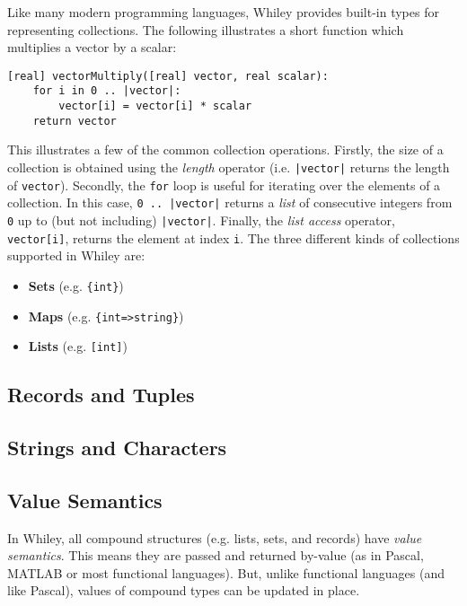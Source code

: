 Like many modern programming languages, Whiley provides built-in types
for representing collections.  The following illustrates a short
function which multiplies a vector by a scalar:
\begin{lstlisting}
[real] vectorMultiply([real] vector, real scalar):
    for i in 0 .. |vector|:
        vector[i] = vector[i] * scalar
    return vector
\end{lstlisting}
This illustrates a few of the common collection operations.  Firstly,
the size of a collection is obtained using the {\em length} operator
(i.e. \lstinline{|vector|} returns the length of \lstinline{vector}).
Secondly, the \lstinline{for} loop is useful for iterating over the
elements of a collection.  In this case, \lstinline{0 .. |vector|}
returns a {\em list} of consecutive integers from \lstinline{0} up to
(but not including) \lstinline{|vector|}.  Finally, the {\em list
  access} operator, \lstinline{vector[i]}, returns the element at
index \lstinline{i}.  The three different kinds of collections
supported in Whiley are:
\begin{itemize}
\item {\bf Sets} (e.g. \lstinline|{int}|)

\item {\bf Maps} (e.g. \lstinline|{int=>string}|)

\item {\bf Lists} (e.g. \lstinline{[int]})

\end{itemize}


\subsection{Records and Tuples}

\subsection{Strings and Characters}

\subsection{Value Semantics}
\label{value_semantics}
In Whiley, all compound structures (e.g. lists, sets, and records)
have {\em value semantics}.  This means they are passed and returned
by-value (as in Pascal, MATLAB or most functional languages).  But, unlike
functional languages (and like Pascal), values of compound types can
be updated in place.


